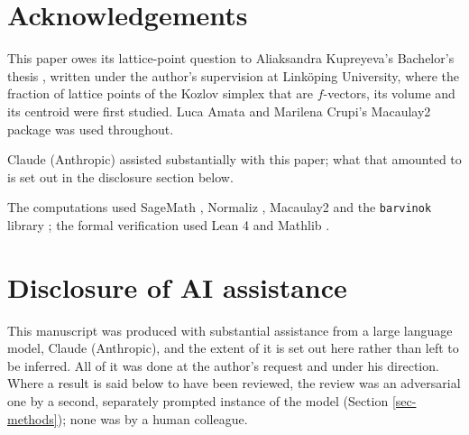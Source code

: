 \documentclass[11pt, a4paper, abstract=yes]{scrartcl}
\theoremstyle{definition}
\theoremstyle{remark}
\theoremstyle{plain}
\theoremstyle{remark}
\theoremstyle{plain}
\let\autocite\cite
\begin{document}
\section*{Acknowledgements}
\label{sec:org6182b05}
This paper owes its lattice-point question to Aliaksandra Kupreyeva's Bachelor's thesis
\autocite{Kupreyeva2019}, written under the author's supervision at Linköping University, where the fraction of
lattice points of the Kozlov simplex that are \(f\)-vectors, its volume and its centroid were first
studied. Luca Amata and Marilena Crupi's Macaulay2 package \autocite{AmataCrupi2021} was used
throughout.

Claude (Anthropic) assisted substantially with this paper; what that amounted to is set out in the
disclosure section below.

The computations used SageMath \autocite{SageMath}, Normaliz \autocite{BrunsIchim2010}, Macaulay2
\autocite{Macaulay2} and the \texttt{barvinok} library \autocite{Verdoolaege2007}; the formal verification used
Lean 4 \autocite{deMouraUllrich2021} and Mathlib \autocite{Mathlib2020}.
\section*{Disclosure of AI assistance}
\label{sec:org260b5cc}
This manuscript was produced with substantial assistance from a large language model, Claude
(Anthropic), and the extent of it is set out here rather than left to be inferred. All of it was
done at the author's request and under his direction. Where a result is said below to have been
reviewed, the review was an adversarial one by a second, separately prompted instance of the model
(Section \ref{sec-methods}); none was by a human colleague.
\end{document}
